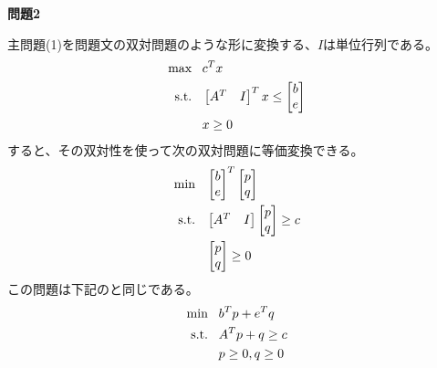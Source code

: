 \documentclass{jsarticle}
\begin{document}
{\bf 問題2}

主問題(1)を問題文の双対問題のような形に変換する、$I$は単位行列である。
\begin{equation*}
\begin{split}
\text{max\,\,\,\,\,}& c^Tx \\
\text{s.t.\,\,\,\,\,}&
\begin{bmatrix}
A^T  & I
\end{bmatrix}
^Tx \le
\begin{bmatrix}
b \\
e
\end{bmatrix}
\\
&x \ge 0
\end{split}
\end{equation*}
すると、その双対性を使って次の双対問題に等価変換できる。
\begin{equation*}
\begin{split}
\text{min\,\,\,\,\,}&
\begin{bmatrix}
b \\
e
\end{bmatrix}^T
\begin{bmatrix}
p \\
q
\end{bmatrix}
\\
\text{s.t.\,\,\,\,\,}&
\begin{bmatrix}
A^T  & I
\end{bmatrix}
\begin{bmatrix}
p \\
q
\end{bmatrix}
\ge
c
\\
& \begin{bmatrix}
p \\
q
\end{bmatrix} \ge 0
\end{split}
\end{equation*}
この問題は下記のと同じである。
\begin{equation*}
\begin{split}
\text{min\,\,\,\,\,}& b^Tp + e^Tq \\
\text{s.t.\,\,\,\,\,}&
A^Tp + q \ge c \\
& p \ge 0, q \ge 0
\end{split}
\end{equation*}
\end{document}
